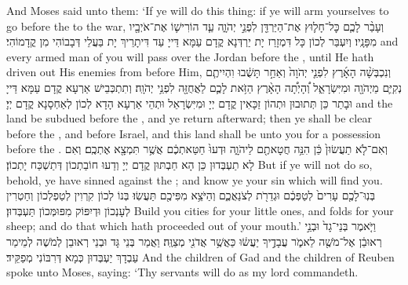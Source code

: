 {And Moses said unto them: ‘If ye will do this thing: if ye will arm yourselves to go before the \lord\space to the war,}{}
{וְעָבַ֨ר לָכֶ֧ם כׇּל־חָל֛וּץ אֶת־הַיַּרְדֵּ֖ן לִפְנֵ֣י יְהֹוָ֑ה עַ֧ד הוֹרִישׁ֛וֹ אֶת־אֹיְבָ֖יו מִפָּנָֽיו׃}
{וְיִעְבַּר לְכוֹן כָּל דִּמְזָרַז יָת יַרְדְּנָא קֳדָם עַמָּא דַּייָ עַד דִּיתָרֵיךְ יָת בַּעֲלֵי דְּבָבוֹהִי מִן קֳדָמוֹהִי׃}
{and every armed man of you will pass over the Jordan before the \lord, until He hath driven out His enemies from before Him,}{}
{וְנִכְבְּשָׁ֨ה הָאָ֜רֶץ לִפְנֵ֤י יְהֹוָה֙ וְאַחַ֣ר תָּשֻׁ֔בוּ וִהְיִיתֶ֧ם נְקִיִּ֛ם מֵיְהֹוָ֖ה וּמִיִּשְׂרָאֵ֑ל וְ֠הָיְתָ֠ה הָאָ֨רֶץ הַזֹּ֥את לָכֶ֛ם לַאֲחֻזָּ֖ה לִפְנֵ֥י יְהֹוָֽה׃}
{וְתִתְכְּבֵישׁ אַרְעָא קֳדָם עַמָּא דַּייָ וּבָתַר כֵּן תְּתוּבוּן וּתְהוֹן זַכָּאִין קֳדָם יְיָ וּמִיִּשְׂרָאֵל וּתְהֵי אַרְעָא הָדָא לְכוֹן לְאַחְסָנָא קֳדָם יְיָ׃}
{and the land be subdued before the \lord, and ye return afterward; then ye shall be clear before the \lord, and before Israel, and this land shall be unto you for a possession before the \lord.}{}
{וְאִם־לֹ֤א תַעֲשׂוּן֙ כֵּ֔ן הִנֵּ֥ה חֲטָאתֶ֖ם לַיהֹוָ֑ה וּדְעוּ֙ חַטַּאתְכֶ֔ם אֲשֶׁ֥ר תִּמְצָ֖א אֶתְכֶֽם׃}
{וְאִם לָא תַעְבְּדוּן כֵּן הָא חַבְתּוּן קֳדָם יְיָ וְדַעוּ חוֹבַתְכוֹן דְּתַשְׁכַּח יָתְכוֹן׃}
{But if ye will not do so, behold, ye have sinned against the \lord; and know ye your sin which will find you.}{}
{בְּנֽוּ־לָכֶ֤ם עָרִים֙ לְטַפְּכֶ֔ם וּגְדֵרֹ֖ת לְצֹנַאֲכֶ֑ם וְהַיֹּצֵ֥א מִפִּיכֶ֖ם תַּעֲשֽׂוּ׃
}
{בְּנוֹ לְכוֹן קִרְוִין לְטַפְלְכוֹן וְחַטְרִין לְעָנְכוֹן וּדְיִפּוֹק מִפּוּמְּכוֹן תַּעְבְּדוּן׃}
{Build you cities for your little ones, and folds for your sheep; and do that which hath proceeded out of your mouth.’}{}
{וַיֹּ֤אמֶר בְּנֵי־גָד֙ וּבְנֵ֣י רְאוּבֵ֔ן אֶל־מֹשֶׁ֖ה לֵאמֹ֑ר עֲבָדֶ֣יךָ יַעֲשׂ֔וּ כַּאֲשֶׁ֥ר אֲדֹנִ֖י מְצַוֶּֽה׃
}
{וַאֲמַר בְּנֵי גָּד וּבְנֵי רְאוּבֵן לְמֹשֶׁה לְמֵימַר עַבְדָךְ יַעְבְּדוּן כְּמָא דְּרִבּוֹנִי מְפַקֵּיד׃}
{And the children of Gad and the children of Reuben spoke unto Moses, saying: ‘Thy servants will do as my lord commandeth.}{}
